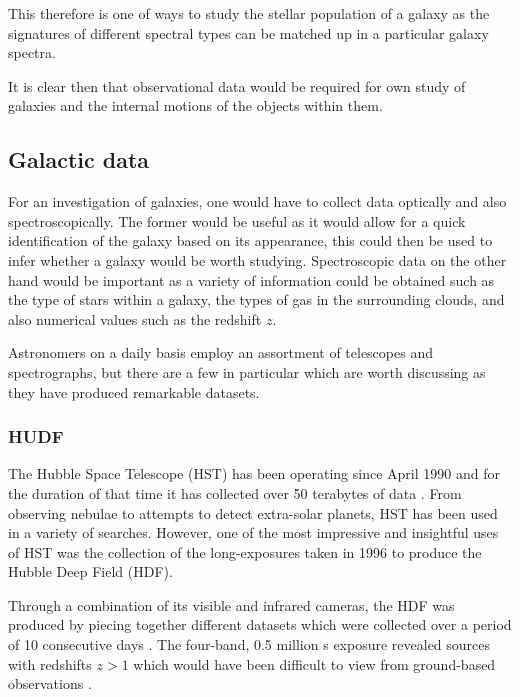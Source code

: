 \documentclass[12pt, twocolumn]{revtex4-1}    %
\begin{document}
This therefore is one of ways to study the stellar population of a galaxy as the signatures of different spectral types can be matched up in a particular galaxy spectra. 

It is clear then that observational data would be required for own study of galaxies and the internal motions of the objects within them. 

\subsection{Galactic data} 

For an investigation of galaxies, one would have to collect data optically and also spectroscopically. The former would be useful as it would allow for a quick identification of the galaxy based on its appearance, this could then be used to infer whether a galaxy would be worth studying. Spectroscopic data on the other hand would be important as a variety of information could be obtained such as the type of stars within a galaxy, the types of gas in the surrounding clouds, and also numerical values such as the redshift $z$. 

Astronomers on a daily basis employ an assortment of telescopes and spectrographs, but there are a few in particular which are worth discussing as they have produced remarkable datasets.

\subsubsection{HUDF}

The Hubble Space Telescope (HST) has been operating since April 1990 and for the duration of that time it has collected over 50 terabytes of data \citep{mccoy_space_sciences}. From observing nebulae to attempts to detect extra-solar planets, HST has been used in a variety of searches. However, one of the most impressive and insightful uses of HST was the collection of the long-exposures taken in 1996 to produce the Hubble Deep Field (HDF). 

Through a combination of its visible and infrared cameras, the HDF was produced by piecing together different datasets which were collected over a period of 10 consecutive days \citep{mccoy_space_sciences, williams_hdp}. The four-band, 0.5 million s exposure revealed sources with redshifts $z>1$ which would have been difficult to view from ground-based observations \citep{beckwith_hudf}. 

\end{document}
